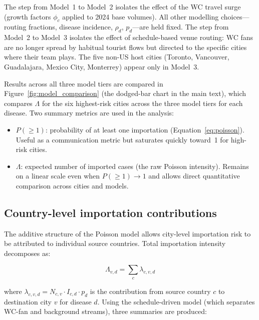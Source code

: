 \documentclass[12pt]{article}
\begin{document}
The step from Model~1 to Model~2 isolates the effect of the WC travel
surge (growth factors $\phi_c$ applied to 2024 base volumes). All
other modelling choices---routing fractions, disease incidence,
$\rho_d$, $p_d$---are held fixed.
The step from Model~2 to Model~3 isolates the effect of schedule-based
venue routing: WC fans are no longer spread by habitual tourist flows
but directed to the specific cities where their team plays. The five
non-US host cities (Toronto, Vancouver, Guadalajara, Mexico City,
Monterrey) appear only in Model~3.

Results across all three model tiers are compared in
Figure~\ref{fig:model_comparison} (the dodged-bar chart in the main text),
which compares $\Lambda$ for the six highest-risk cities across the
three model tiers for each disease. Two summary metrics are used in
the analysis:
\begin{itemize}
  \item $P(\geq 1)$: probability of at least one importation
    (Equation~\ref{eq:poisson}). Useful as a communication metric but
    saturates quickly toward~1 for high-risk cities.
  \item $\Lambda$: expected number of imported cases (the raw Poisson
    intensity). Remains on a linear scale even when $P(\geq 1) \to 1$
    and allows direct quantitative comparison across cities and models.
\end{itemize}

\subsection*{Country-level importation contributions}

The additive structure of the Poisson model allows city-level
importation risk to be attributed to individual source countries.
Total importation intensity decomposes as:

\begin{equation}
  \Lambda_{v,d} = \sum_c \lambda_{c,v,d}
  \label{eq:decompose}
\end{equation}

where $\lambda_{c,v,d} = N_{c,v} \cdot I_{c,d} \cdot p_d$ is the
contribution from source country $c$ to destination city $v$ for
disease $d$. Using the schedule-driven model (which separates WC-fan
and background streams), three summaries are produced:
\end{document}
